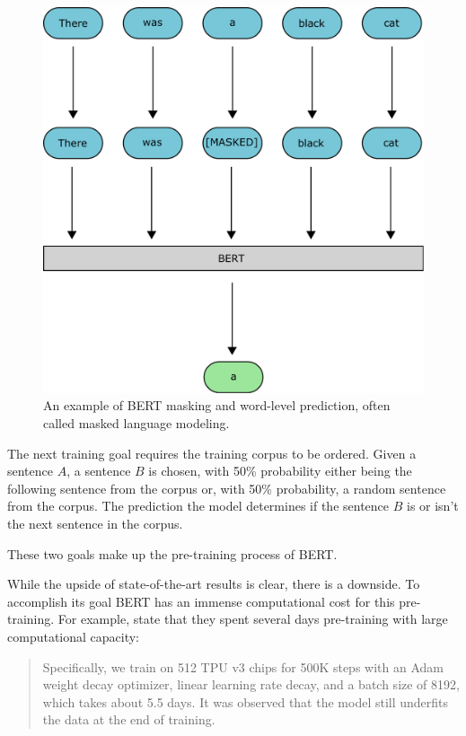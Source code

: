 \documentclass[nofilelist]{cslthse-msc}
\begin{document}
\begin{figure}[ht]
    \centering
    \includegraphics[width=\textwidth/2]{BERTmasking.pdf}
    \caption{An example of BERT masking and word-level prediction, often called masked language modeling.}
    \label{fig:BERTmasking}
\end{figure}

The next training goal requires the training corpus to be ordered. Given a sentence $A$, a sentence $B$ is chosen, with 50\% probability either being the following sentence from the corpus or, with 50\% probability, a random sentence from the corpus. The prediction the model determines if the sentence $B$ is or isn't the next sentence in the corpus. 

These two goals make up the pre-training process of BERT.

While the upside of state-of-the-art results is clear, there is a downside. To accomplish its goal BERT has an immense computational cost for this pre-training. For example, \citet{DBLP:journals/corr/abs-1906-08237} state that they spent several days pre-training with large computational capacity:

\begin{quote}
Specifically, we train on 512 TPU v3 chips for 500K steps with an Adam weight decay optimizer, linear learning rate decay, and a batch size of 8192, which takes about 5.5 days. It was observed that the model still underfits the data at the end of training.
\end{quote}
\end{document}
